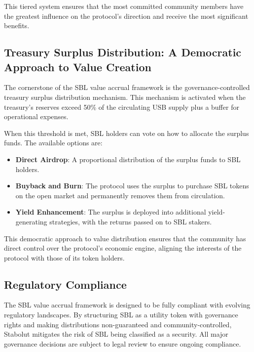 This tiered system ensures that the most committed community members have the greatest influence on the protocol's direction and receive the most significant benefits.

\subsection{Treasury Surplus Distribution: A Democratic Approach to Value Creation}
The cornerstone of the SBL value accrual framework is the governance-controlled treasury surplus distribution mechanism. This mechanism is activated when the treasury's reserves exceed 50\% of the circulating USB supply plus a buffer for operational expenses.

When this threshold is met, SBL holders can vote on how to allocate the surplus funds. The available options are:

\begin{itemize}
    \item \textbf{Direct Airdrop}: A proportional distribution of the surplus funds to SBL holders.
    \item \textbf{Buyback and Burn}: The protocol uses the surplus to purchase SBL tokens on the open market and permanently removes them from circulation.
    \item \textbf{Yield Enhancement}: The surplus is deployed into additional yield-generating strategies, with the returns passed on to SBL stakers.
\end{itemize}

This democratic approach to value distribution ensures that the community has direct control over the protocol's economic engine, aligning the interests of the protocol with those of its token holders.

\subsection{Regulatory Compliance}
The SBL value accrual framework is designed to be fully compliant with evolving regulatory landscapes. By structuring SBL as a utility token with governance rights and making distributions non-guaranteed and community-controlled, Stabolut mitigates the risk of SBL being classified as a security. All major governance decisions are subject to legal review to ensure ongoing compliance.

